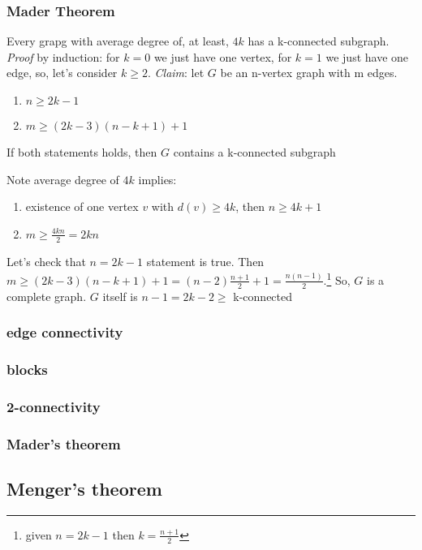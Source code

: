 \documentclass[main]{subfiles}
\begin{document}
\subsubsection{Mader Theorem}
Every grapg with average degree of, at least, $4k$ has a k-connected subgraph.
\textit{Proof} by induction: for $k = 0$ we just have one vertex, for $k=1$ we just have one edge, so, let's consider $k\geq 2$.
\textit{Claim}: let $G$ be an n-vertex graph with m edges.
\begin{enumerate}
\item $n \geq 2k - 1$
\item $m \geq (2k-3)(n-k+1)+1$
\end{enumerate}
If both statements holds, then $G$ contains a k-connected subgraph

Note average degree of $4k$ implies:
\begin{enumerate}
\item existence of one vertex $v$ with $d(v) \geq 4k$, then $n \geq 4k + 1$
\item $m \geq \frac{4kn}{2} = 2kn$
\end{enumerate}

Let's check that $n = 2k-1$ statement is true. Then $m \geq (2k-3)(n-k+1)+1 = (n-2)\frac{n+1}{2}+1 = \frac{n(n-1)}{2}$.\footnote{given $n=2k-1$ then $k=\frac{n+1}{2}$} So, $G$ is a complete graph. $G$ itself is $n-1 = 2k-2 \geq $ k-connected

\subsubsection{edge connectivity}

\subsubsection{blocks}

\subsubsection{2-connectivity}

\subsubsection{Mader's theorem}

\subsection{Menger's theorem}
\end{document}
